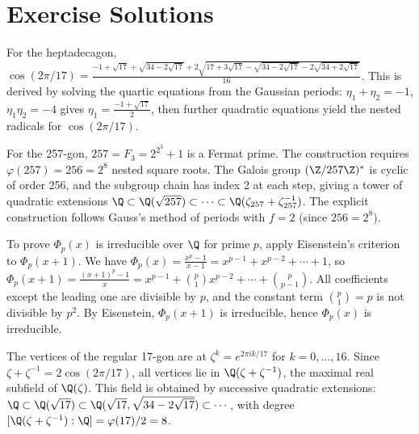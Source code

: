 \section{Exercise Solutions}

\begin{solution}
For the heptadecagon, $\cos(2\pi/17) = \frac{-1 + \sqrt{17} + \sqrt{34-2\sqrt{17}} + 2\sqrt{17+3\sqrt{17}-\sqrt{34-2\sqrt{17}}-2\sqrt{34+2\sqrt{17}}}}{16}$. This is derived by solving the quartic equations from the Gaussian periods: $\eta_1 + \eta_2 = -1$, $\eta_1\eta_2 = -4$ gives $\eta_1 = \frac{-1+\sqrt{17}}{2}$, then further quadratic equations yield the nested radicals for $\cos(2\pi/17)$.
\end{solution}

\begin{solution}
For the 257-gon, $257 = F_3 = 2^{2^3}+1$ is a Fermat prime. The construction requires $\varphi(257) = 256 = 2^8$ nested square roots. The Galois group $(\Z/257\Z)^*$ is cyclic of order 256, and the subgroup chain has index 2 at each step, giving a tower of quadratic extensions $\Q \subset \Q(\sqrt{257}) \subset \cdots \subset \Q(\zeta_{257} + \zeta_{257}^{-1})$. The explicit construction follows Gauss's method of periods with $f = 2$ (since $256 = 2^8$).
\end{solution}

\begin{solution}
To prove $\Phi_p(x)$ is irreducible over $\Q$ for prime $p$, apply Eisenstein's criterion to $\Phi_p(x+1)$. We have $\Phi_p(x) = \frac{x^p-1}{x-1} = x^{p-1} + x^{p-2} + \cdots + 1$, so $\Phi_p(x+1) = \frac{(x+1)^p-1}{x} = x^{p-1} + \binom{p}{1}x^{p-2} + \cdots + \binom{p}{p-1}$. All coefficients except the leading one are divisible by $p$, and the constant term $\binom{p}{1} = p$ is not divisible by $p^2$. By Eisenstein, $\Phi_p(x+1)$ is irreducible, hence $\Phi_p(x)$ is irreducible.
\end{solution}

\begin{solution}
The vertices of the regular 17-gon are at $\zeta^k = e^{2\pi ik/17}$ for $k = 0, \ldots, 16$. Since $\zeta + \zeta^{-1} = 2\cos(2\pi/17)$, all vertices lie in $\Q(\zeta + \zeta^{-1})$, the maximal real subfield of $\Q(\zeta)$. This field is obtained by successive quadratic extensions: $\Q \subset \Q(\sqrt{17}) \subset \Q(\sqrt{17}, \sqrt{34-2\sqrt{17}}) \subset \cdots$, with degree $[\Q(\zeta+\zeta^{-1}):\Q] = \varphi(17)/2 = 8$.
\end{solution}
